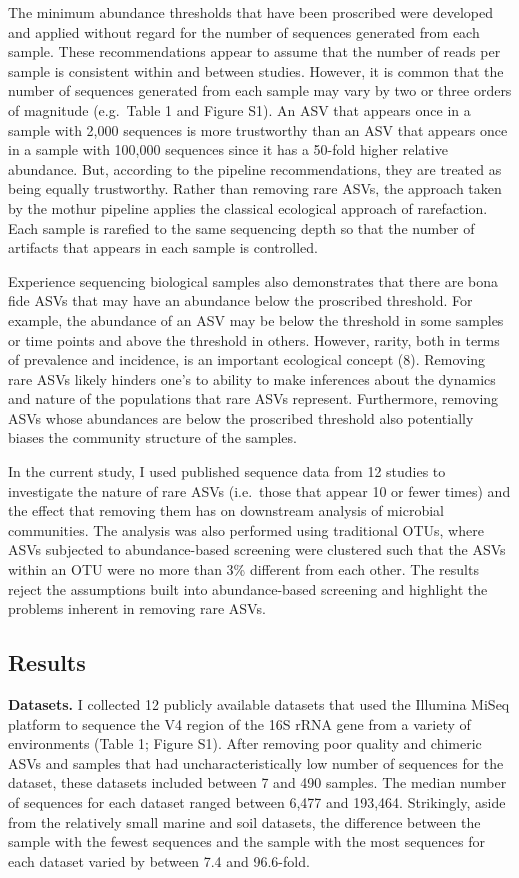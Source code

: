 \documentclass[
]{article}
\begin{document}
The minimum abundance thresholds that have been proscribed were
developed and applied without regard for the number of sequences
generated from each sample. These recommendations appear to assume that
the number of reads per sample is consistent within and between studies.
However, it is common that the number of sequences generated from each
sample may vary by two or three orders of magnitude (e.g.~Table 1 and
Figure S1). An ASV that appears once in a sample with 2,000 sequences is
more trustworthy than an ASV that appears once in a sample with 100,000
sequences since it has a 50-fold higher relative abundance. But,
according to the pipeline recommendations, they are treated as being
equally trustworthy. Rather than removing rare ASVs, the approach taken
by the mothur pipeline applies the classical ecological approach of
rarefaction. Each sample is rarefied to the same sequencing depth so
that the number of artifacts that appears in each sample is controlled.

Experience sequencing biological samples also demonstrates that there
are bona fide ASVs that may have an abundance below the proscribed
threshold. For example, the abundance of an ASV may be below the
threshold in some samples or time points and above the threshold in
others. However, rarity, both in terms of prevalence and incidence, is
an important ecological concept (8). Removing rare ASVs likely hinders
one's to ability to make inferences about the dynamics and nature of the
populations that rare ASVs represent. Furthermore, removing ASVs whose
abundances are below the proscribed threshold also potentially biases
the community structure of the samples.

In the current study, I used published sequence data from 12 studies to
investigate the nature of rare ASVs (i.e.~those that appear 10 or fewer
times) and the effect that removing them has on downstream analysis of
microbial communities. The analysis was also performed using traditional
OTUs, where ASVs subjected to abundance-based screening were clustered
such that the ASVs within an OTU were no more than 3\% different from
each other. The results reject the assumptions built into
abundance-based screening and highlight the problems inherent in
removing rare ASVs.

\hypertarget{results}{%
\subsection{Results}\label{results}}

\textbf{Datasets.} I collected 12 publicly available datasets that used
the Illumina MiSeq platform to sequence the V4 region of the 16S rRNA
gene from a variety of environments (Table 1; Figure S1). After removing
poor quality and chimeric ASVs and samples that had uncharacteristically
low number of sequences for the dataset, these datasets included between
7 and 490 samples. The median number of sequences for each dataset
ranged between 6,477 and 193,464. Strikingly, aside from the relatively
small marine and soil datasets, the difference between the sample with
the fewest sequences and the sample with the most sequences for each
dataset varied by between 7.4 and 96.6-fold.
\end{document}
